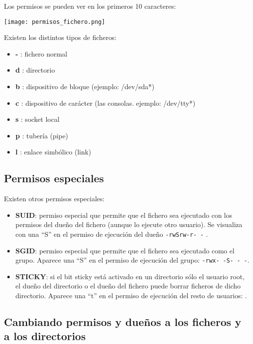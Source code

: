 Los permisos se pueden ver en los primeros 10 caracteres:

\begin{center}
  \texttt{[image: permisos\_fichero.png]}
\end{center}

Existen los distintos tipos de ficheros:
\begin{itemize}
    \item \textbf{-} : fichero normal
    \item \textbf{d} : directorio
    \item \textbf{b} : dispositivo de bloque (ejemplo: /dev/sda*)
    \item \textbf{c} : dispositivo de carácter (las consolas. ejemplo: /dev/tty*)
    \item \textbf{s} : socket local
    \item \textbf{p} : tubería (pipe)
    \item \textbf{l} : enlace simbólico (link)
\end{itemize}

\subsection{Permisos especiales}

Existen otros permisos especiales:
\begin{itemize}
    \item \textbf{SUID}: permiso especial que permite que el fichero sea ejecutado con los permisos del dueño del fichero (aunque lo ejecute otro usuario). Se visualiza con una “S” en el permiso de ejecución del dueño  \texttt{-rwSrw-r- -} .
    \item \textbf{SGID}: permiso especial que permite que el fichero sea ejecutado como el grupo. Aparece una “S” en el permiso de ejecución del grupo: \texttt{-rwx- -S- - -}.

    \item \textbf{STICKY}: si el bit sticky está activado en un directorio sólo el usuario root, el dueño del directorio o el dueño del fichero puede borrar ficheros de dicho directorio. Aparece una “t” en el permiso de ejecución del resto de usuarios: .

\end{itemize}

\subsection{Cambiando permisos y dueños a los ficheros y a los directorios}

